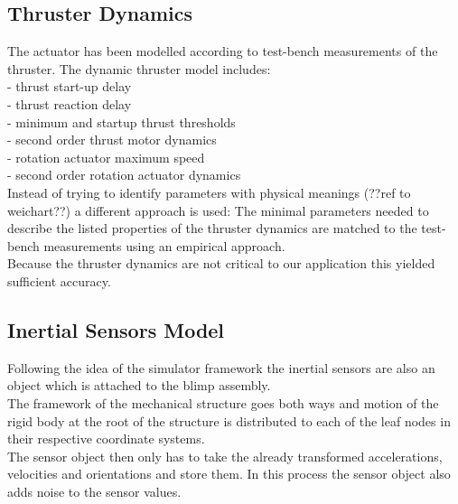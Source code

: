 \subsection{Thruster Dynamics}
\label{sub:thrust_dynamics}
The actuator has been modelled according to test-bench measurements of the thruster.
The dynamic thruster model includes:\\
- thrust start-up delay\\
- thrust reaction delay\\
- minimum and startup thrust thresholds\\
- second order thrust motor dynamics\\
- rotation actuator maximum speed\\
- second order rotation actuator dynamics\\
Instead of trying to identify parameters with physical meanings (??ref to weichart??) a different approach is used:
The minimal parameters needed to describe the listed properties of the thruster dynamics are matched to the test-bench measurements using an empirical approach.  \\
Because the thruster dynamics are not critical to our application this yielded sufficient accuracy.

\subsection{Inertial Sensors Model}
\label{sub:imu_model}
Following the idea of the simulator framework the inertial sensors are also an object which is attached to the blimp assembly. \\
The framework of the mechanical structure goes both ways and motion of the rigid body at the root of the structure is distributed to each of the leaf nodes in their respective coordinate systems. \\
The sensor object then only has to take the already transformed accelerations, velocities and orientations and store them.
In this process the sensor object also adds noise to the sensor values.

